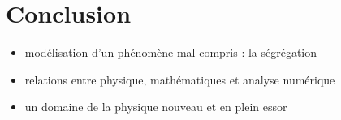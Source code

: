 \documentclass[xcolor=dvipsnames]{beamer}
\begin{document}
\begin{frame}
\end{frame}

\section{Conclusion}
\begin{frame}

\begin{itemize}
\item modélisation d'un phénomène mal compris : la ségrégation
\item relations entre physique, mathématiques et analyse numérique 
\item un domaine de la physique nouveau et en plein essor
\end{itemize}

\end{frame}
\end{document}
